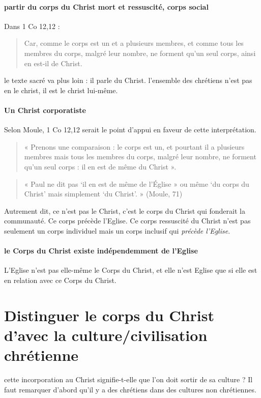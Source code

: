   \paragraph{partir du corps du Christ mort et ressuscité, corps social}
 Dans 1 Co 12,12 : 
 \begin{quote}
     Car, comme le corps est un et a plusieurs membres, et comme tous les membres du corps, malgré leur nombre, ne forment qu'un seul corps, ainsi en est-il de Christ.
 \end{quote}
 le texte sacré va plus loin : il parle du Christ. l'ensemble des chrétiens n'est pas en le christ, il est le christ lui-même. 
 \paragraph{Un Christ corporatiste}
 Selon Moule, 1 Co 12,12 serait le point d’appui en faveur de cette interprétation. 
 \begin{quote}
     « Prenons une comparaison : le corps est un, et pourtant il a plusieurs membres  mais tous les membres du corps, malgré leur nombre, ne forment qu’un seul corps : il en est de même du Christ ».
 \end{quote}
 
 \begin{quote}
     «  Paul ne dit pas ‘il en est de même de l’Église » ou même ‘du corps du Christ’ mais simplement ‘du Christ’. » (Moule, 71)
 \end{quote}
 Autrement dit, ce n'est pas le Christ, c'est le corps du Christ qui fonderait la communauté.
 Ce corps précède l'Eglise. Ce corps ressuscité du Christ n'est pas seulement un corps individuel mais un corps inclusif qui \textit{précède l'Eglise}. 
 \paragraph{le Corps du Christ existe indépendemment de l'Eglise}


 L'Eglise n'est pas elle-même le Corps du Christ, et elle n'est Eglise que si elle est en relation avec ce Corps du Christ.
 
\section{Distinguer le corps du Christ d’avec la culture/civilisation chrétienne }

cette incorporation au Christ signifie-t-elle que l'on doit sortir de sa culture ? 
Il faut remarquer d'abord qu'il y a des chrétiens dans des cultures non chrétiennes. 


